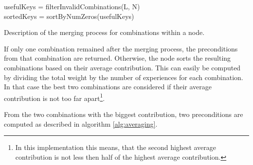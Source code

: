 \begin{algorithm}
	
	\BlankLine
	usefulKeys = filterInvalidCombinations(L, N) \\
	sortedKeys = sortByNumZeros(usefulKeys) \\
	\caption{Description of the merging process for combinations within a node.}
	\label{alg:combinationMerging}
\end{algorithm}

If only one combination remained after the merging process, the preconditions from that combination are returned. Otherwise, the node sorts the resulting combinations based on their average contribution. This can easily be computed by dividing the total weight by the number of experiences for each combination.
In that case the best two combinations are considered if their average contribution is not too far apart\footnote{In this implementation this means, that the second highest average contribution is not less then half of the highest average contribution.}.

From the two combinations with the biggest contribution, two preconditions are computed as described in algorithm \ref{alg:averaging}.

